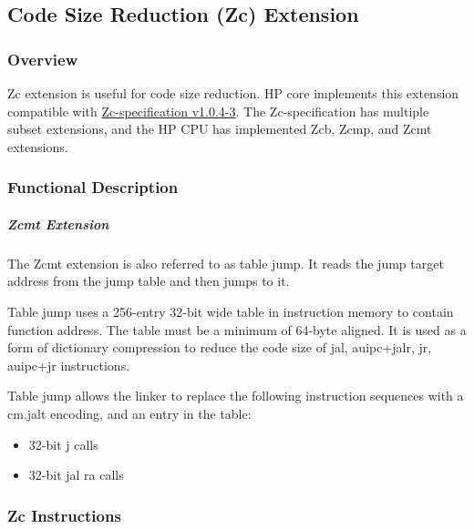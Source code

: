 \documentclass[main\_\_EN.tex]{subfiles}
\begin{document}
\newpage
\subsection{Code Size Reduction (Zc) Extension}
\label{sec:riscvcpu-zc}

\subsubsection{Overview}
\label{sec:riscvcpu-zc-overview}

Zc extension is useful for code size reduction. HP core implements this extension compatible with \href{https://github.com/riscvarchive/riscv-code-size-reduction/blob/v1.0.4-3/Zc-specification/Zc.adoc}{Zc-specification v1.0.4-3}. The Zc-specification has multiple subset extensions, and the \chipname HP CPU has implemented Zcb, Zcmp, and Zcmt extensions.

\subsubsection{Functional Description}
\label{sec:riscvcpu-zc-func-descr}








\subparagraph{Zcmt Extension}

The Zcmt extension is also referred to as table jump. It reads the jump target address from the jump table and then jumps to it.

Table jump uses a 256-entry 32-bit wide table in instruction memory to contain function address. The table must be a minimum of 64-byte aligned. It is used as a form of dictionary compression to reduce the code size of jal, auipc+jalr, jr, auipc+jr instructions.

Table jump allows the linker to replace the following instruction sequences with a cm.jalt encoding, and an entry in the table:
\begin{itemize}
    \item 32-bit j calls
    \item 32-bit jal ra calls
\end{itemize}

\subsubsection{Zc Instructions}
\label{sec:riscvcpu-zc-insn-descr}
\end{document}
